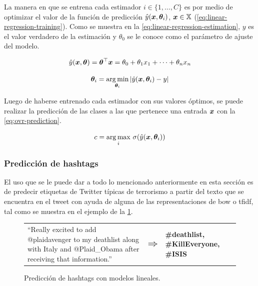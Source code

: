 La manera en que se entrena cada estimador $i \in \{1, \ldots, C\}$ es por medio de optimizar el valor de la función de predicción $\hat{y}({\bm{x}}, {\bm{\theta}}_i)$, ${\bm{x}} \in {\mathbb{X}}$ (\cref{eq:linear-regression-training}). Como se muestra en la \cref{eq:linear-regression-estimation}, $y$ es el valor verdadero de la estimación y $\theta_0$ se le conoce como el parámetro de ajuste del modelo.

\begin{equation} \label{eq:linear-regression-training}
  \hat{y}({\bm{x}}, {\bm{\theta}}) = {\bm{\theta}}^{\top} {\bm{x}} = \theta_0 + \theta_1 x_1 + \cdots + \theta_n x_n
\end{equation}

\begin{equation} \label{eq:linear-regression-estimation}
  {\bm{\theta}}_i = \operatorname*{arg\,min}_{{\bm{\theta}}_i} | \hat{y}({\bm{x}}, {\bm{\theta}}_i) - y|
\end{equation}

Luego de haberse entrenado cada estimador con sus valores óptimos, se puede realizar la predicción de las clases a las que pertenece una entrada ${\bm{x}}$ con la \cref{eq:ovr-prediction}.

\begin{equation} \label{eq:ovr-prediction}
  c = \operatorname*{arg\,max}_i \, \sigma(\hat{y}({\bm{x}}, {\bm{\theta}}_i))
\end{equation}

\subsubsection{Predicción de hashtags}
El uso que se le puede dar a todo lo mencionado anteriormente en esta sección es de predecir etiquetas de Twitter típicas de terrorismo a partir del texto que se encuentra en el tweet con ayuda de alguna de las representaciones de \gls{bow} o \gls{tfidf}, tal como se muestra en el ejemplo de la \cref{fig:tweet-prediction}.

\begin{figure}[H]
  \centering
  \begin{tabular}{p{} p{} p{}}
    ``Really excited to add @plaidavenger to my deathlist along with Italy and @Plaid\_Obama after receiving that information.'' & $\mathlarger{\mathlarger{\mathlarger{\Rightarrow}}}$ & \textbf{\#deathlist, \#KillEveryone, \#ISIS}
  \end{tabular}
  \decoRule
  \caption{Predicción de hashtags con modelos lineales.}
  \label{fig:tweet-prediction}
\end{figure}

